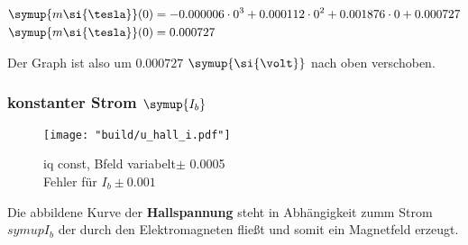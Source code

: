 \begin{align}
   \symup{m\si{\tesla}}(0)&=-0.000006 \cdot 0^3 + 0.000112 \cdot 0^2 + 0.001876 \cdot 0 + 0.000727 \\
   \symup{m\si{\tesla}}(0)&=0.000727
\end{align}

Der Graph ist also um $0.000727$ $\symup{\si{\volt}}$ nach oben verschoben.


\subsubsection{konstanter Strom $\symup{I_b}$}
\label{sec:Auswertung_iconst}

\begin{figure}
   \centering
    \texttt{[image: "build/u\_hall\_i.pdf"]}
    \caption{iq const, Bfeld variabelt$\pm$ 0.0005\\Fehler für $I_b \pm 0.001$}
    \label{fig:Uhall}
 \end{figure}


Die abbildene Kurve der \textbf{Hallspannung} steht in Abhängigkeit zumm Strom $symup{I_b}$ der durch den Elektromagneten fließt und somit ein Magnetfeld erzeugt.








\newpage